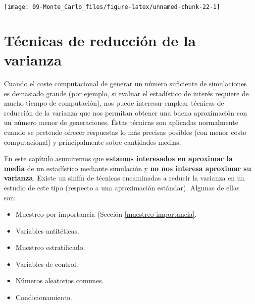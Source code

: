 \documentclass[
]{book}
\newenvironment{Shaded}{\begin{snugshade}}{\end{snugshade}}
\newcommand{\CommentTok}[1]{\textcolor[rgb]{0.56,0.35,0.01}{\textit{#1}}}
\newcommand{\DataTypeTok}[1]{\textcolor[rgb]{0.13,0.29,0.53}{#1}}
\newcommand{\DecValTok}[1]{\textcolor[rgb]{0.00,0.00,0.81}{#1}}
\newcommand{\KeywordTok}[1]{\textcolor[rgb]{0.13,0.29,0.53}{\textbf{#1}}}
\newcommand{\NormalTok}[1]{#1}
\newcommand{\OperatorTok}[1]{\textcolor[rgb]{0.81,0.36,0.00}{\textbf{#1}}}
\theoremstyle{break}
\theoremstyle{definition}
\theoremstyle{definition}
\theoremstyle{definition}
\theoremstyle{remark}
\begin{document}
\begin{Shaded}
\end{Shaded}

\begin{center}\texttt{[image: 09-Monte\_Carlo\_files/figure-latex/unnamed-chunk-22-1]} \end{center}

\hypertarget{tuxe9cnicas-de-reducciuxf3n-de-la-varianza}{%
\chapter{Técnicas de reducción de la varianza}\label{tuxe9cnicas-de-reducciuxf3n-de-la-varianza}}

Cuando el coste computacional de generar un número suficiente de simulaciones es demasiado grande (por ejemplo, si evaluar el estadístico de interés requiere de mucho tiempo de computación), nos puede interesar emplear técnicas de reducción de la varianza que nos permitan obtener una buena aproximación con un número menor de generaciones. Éstas técnicas son aplicadas normalmente cuando se pretende ofrecer respuestas lo más precisas posibles (con menor costo computacional) y principalmente sobre cantidades medias.

En este capítulo asumiremos que \textbf{estamos interesados en aproximar la media} de un estadístico mediante simulación y \textbf{no nos interesa aproximar su varianza}.
Existe un sinfín de técnicas encaminadas a reducir la varianza en un estudio de este tipo (respecto a una aproximación estándar).
Algunas de ellas son:

\begin{itemize}
\item
  Muestreo por importancia (Sección \ref{muestreo-importancia}.
\item
  Variables antitéticas.
\item
  Muestreo estratificado.
\item
  Variables de control.
\item
  Números aleatorios comunes.
\item
  Condicionamiento.
\end{itemize}
\end{document}
